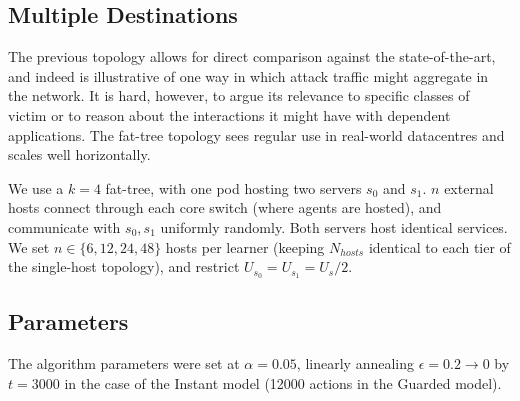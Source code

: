 \documentclass[10pt, times, comsoc]{IEEEtran}
\begin{document}
\subsection{Multiple Destinations}
The previous topology allows for direct comparison against the state-of-the-art, and indeed is illustrative of one way in which attack traffic might aggregate in the network.
It is hard, however, to argue its relevance to specific classes of victim or to reason about the interactions it might have with dependent applications.
The fat-tree topology \cite{DBLP:conf/sigcomm/Al-FaresLV08} sees regular use in real-world datacentres and scales well horizontally.

We use a $k=4$ fat-tree, with one pod hosting two servers $s_0$ and $s_1$.
$n$ external hosts connect through each core switch (where agents are hosted), and communicate with $s_0, s_1$ uniformly randomly.
Both servers host identical services.
We set $n \in \{6, 12, 24, 48\}$ hosts per learner (keeping $N_{\mathit{hosts}}$ identical to each tier of the single-host topology), and restrict $U_{s_0} = U_{s_1} = U_s / 2$.

\subsection{Parameters}
The algorithm parameters were set at $\alpha=0.05$, linearly annealing $\epsilon=0.2 \rightarrow 0$ by $t=3000$ in the case of the Instant model (\num{12000} actions in the Guarded model).
\end{document}

